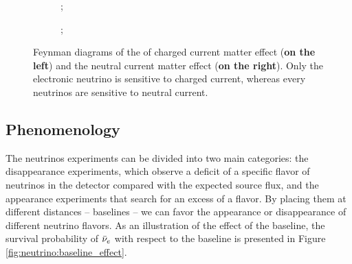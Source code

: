 \begin{figure}[ht]
  \centering
  \begin{subfigure}[t]{0.48\linewidth}
    \centering
    ;
  \end{subfigure}
  \begin{subfigure}[t]{0.48\linewidth}
    \centering
    ;
  \end{subfigure}
  \caption{Feynman diagrams of the of charged current matter effect (\textbf{on the left}) and the neutral current matter effect (\textbf{on the right}). Only the electronic neutrino is sensitive to charged current, whereas every neutrinos are sensitive to neutral current.}
  \label{fig:neutrinos:msw}
\end{figure}

\subsection{Phenomenology}
\label{sec:neutrino:pheno}

The neutrinos experiments can be divided into two main categories: the disappearance experiments, which observe a deficit of a specific flavor of neutrinos in the detector compared with the expected source flux, and the appearance experiments that search for an excess of a flavor. By placing them at different distances -- baselines -- we can favor the appearance or disappearance of different neutrino flavors. As an illustration of the effect of the baseline, the survival probability of $\bar{\nu}_{e}$ with respect to the baseline is presented in Figure \ref{fig:neutrino:baseline_effect}.

